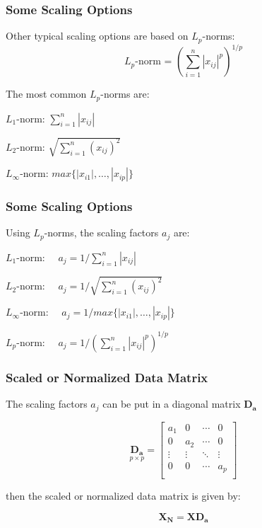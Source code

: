 \documentclass[12pt]{beamer}\usepackage[]{graphicx}\usepackage[]{color}
\begin{document}

\begin{frame}
\frametitle{Some Scaling Options}

Other typical scaling options are based on $L_p$-norms:
$$
L_p\text{-norm = } \left ( \sum_{i=1}^{n} |x_{ij}|^p \right )^{1/p}
$$

\bigskip
The most common $L_p$-norms are:
\bbi
  \item $L_1$-norm: $\sum_{i=1}^{n} | x_{ij} |$
  \item $L_2$-norm: $\sqrt{\sum_{i=1}^{n} (x_{ij})^2}$
  \item $L_{\infty}$-norm: $max \{ |x_{i1}|, \dots, |x_{ip}| \}$
\ei

\end{frame}


\begin{frame}
\frametitle{Some Scaling Options}

Using $L_p$-norms, the scaling factors $a_j$ are:

\bbi
  \item $L_1$-norm: $\quad a_j = 1 / \sum_{i=1}^{n} | x_{ij} |$
  \item $L_2$-norm: $\quad a_j = 1 / \sqrt{\sum_{i=1}^{n} (x_{ij})^2}$
  \item $L_{\infty}$-norm: $\quad a_j = 1 / max \{ |x_{i1}|, \dots, |x_{ip}| \}$
  \item $L_p$-norm: $\quad a_j = 1 / \left ( \sum_{i=1}^{n} |x_{ij}|^p \right )^{1/p}$
\ei

\end{frame}


\begin{frame}
\frametitle{Scaled or Normalized Data Matrix}

The scaling factors $a_j$ can be put in a diagonal matrix $\mathbf{D_a}$

\[ \underset{p \times p}{\mathbf{D_a}} = 
\left[\begin{array}{cccc}
a_1 & 0   & \cdots & 0 \\
0   & a_2 & \cdots & 0 \\
\vdots & \vdots & \ddots & \vdots \\
0   & 0   & \cdots & a_p \\
\end{array}\right]
\]

then the scaled or normalized data matrix is given by:

{\large
$$
\mathbf{X_N} = \mathbf{X D_a}
$$
}

\end{frame}
\end{document}
